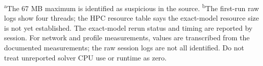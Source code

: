 \noindent\textsuperscript{a}The 67 MB maximum is identified as suspicious in the
source. \textsuperscript{b}The first-run raw logs show four threads; the HPC
resource table says the exact-model resource size is not yet established.
The exact-model rerun status and timing are reported by session. For network
and profile measurements, values are transcribed from the documented
measurements; the raw session logs are not all identified. Do not treat
unreported solver CPU use or runtime as zero.

